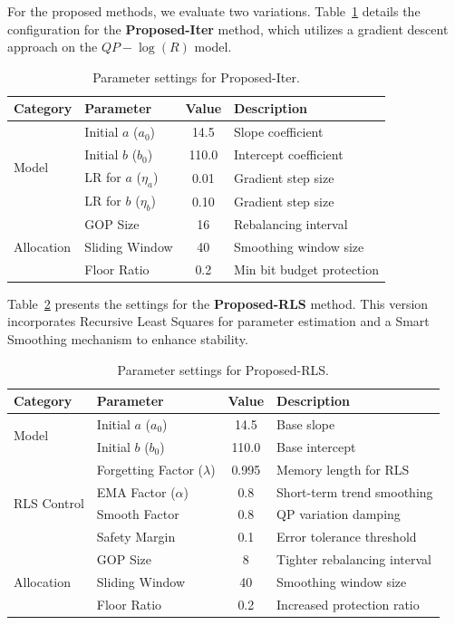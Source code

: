 For the proposed methods, we evaluate two variations. Table~\ref{tab:params_v1} details the configuration for the \textbf{Proposed-Iter} method, which utilizes a gradient descent approach on the $QP-\log(R)$ model.

\begin{table}[ht]
\centering
\caption{Parameter settings for Proposed-Iter.}
\label{tab:params_v1}
\begin{tabular}{@{}llcl@{}}
\toprule
\textbf{Category} & \textbf{Parameter} & \textbf{Value} & \textbf{Description} \\ \midrule
\multirow{4}{*}{Model} 
 & Initial $a$ ($a_0$) & 14.5 & Slope coefficient \\
 & Initial $b$ ($b_0$) & 110.0 & Intercept coefficient \\
 & LR for $a$ ($\eta_a$) & 0.01 & Gradient step size \\
 & LR for $b$ ($\eta_b$) & 0.10 & Gradient step size \\ \midrule
\multirow{3}{*}{Allocation} 
 & GOP Size & 16 & Rebalancing interval \\
 & Sliding Window & 40 & Smoothing window size \\
 & Floor Ratio & 0.2 & Min bit budget protection \\ \bottomrule
\end{tabular}
\end{table}

Table~\ref{tab:params_v15} presents the settings for the \textbf{Proposed-RLS} method. This version incorporates Recursive Least Squares for parameter estimation and a Smart Smoothing mechanism to enhance stability.

\begin{table}[ht]
\centering
\caption{Parameter settings for Proposed-RLS.}
\label{tab:params_v15}
\begin{tabular}{@{}llcl@{}}
\toprule
\textbf{Category} & \textbf{Parameter} & \textbf{Value} & \textbf{Description} \\ \midrule
\multirow{2}{*}{Model} 
 & Initial $a$ ($a_0$) & 14.5 & Base slope \\
 & Initial $b$ ($b_0$) & 110.0 & Base intercept \\ \midrule
\multirow{4}{*}{RLS Control} 
 & Forgetting Factor ($\lambda$) & 0.995 & Memory length for RLS \\
 & EMA Factor ($\alpha$) & 0.8 & Short-term trend smoothing \\
 & Smooth Factor & 0.8 & QP variation damping \\
 & Safety Margin & 0.1 & Error tolerance threshold \\ \midrule
\multirow{3}{*}{Allocation} 
 & GOP Size & 8 & Tighter rebalancing interval \\
 & Sliding Window & 40 & Smoothing window size \\
 & Floor Ratio & 0.2 & Increased protection ratio \\ \bottomrule
\end{tabular}
\end{table}


